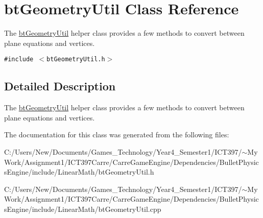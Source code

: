 \hypertarget{classbt_geometry_util}{
\section{btGeometryUtil Class Reference}
\label{classbt_geometry_util}
}
The \hyperlink{classbt_geometry_util}{btGeometryUtil} helper class provides a few methods to convert between plane equations and vertices.  


{\tt \#include $<$btGeometryUtil.h$>$}



\subsection{Detailed Description}
The \hyperlink{classbt_geometry_util}{btGeometryUtil} helper class provides a few methods to convert between plane equations and vertices. 

The documentation for this class was generated from the following files:\begin{CompactItemize}
\item 
C:/Users/New/Documents/Games\_\-Technology/Year4\_\-Semester1/ICT397/$\sim$My Work/Assignment1/ICT397Carre/CarreGameEngine/Dependencies/BulletPhysicsEngine/include/LinearMath/btGeometryUtil.h\item 
C:/Users/New/Documents/Games\_\-Technology/Year4\_\-Semester1/ICT397/$\sim$My Work/Assignment1/ICT397Carre/CarreGameEngine/Dependencies/BulletPhysicsEngine/include/LinearMath/btGeometryUtil.cpp\end{CompactItemize}
